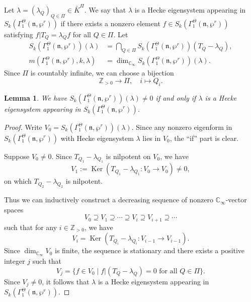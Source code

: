 \documentclass[11pt]{amsart}
\theoremstyle{plain}
\newtheorem{lem}[thm]{Lemma}
\theoremstyle{definition}
\DeclareMathOperator{\Ker}{Ker}
\newcommand{\bZ}{\mathbb{Z}}
\newcommand{\frn}{\mathfrak{n}}
\newcommand{\Cinf}{\mathbb{C}_{\infty}}
\begin{document}
Let $\lambda=(\lambda_Q)_{Q\in \Pi}\in \bar{K}^\Pi$. We say that $\lambda$ is a Hecke eigensystem appearing in $S_k(\Gamma_1^\Theta(\frn,\wp^r))$
if there exists a nonzero element $f\in S_k(\Gamma_1^\Theta(\frn,\wp^r))$ satisfying $f|T_Q=\lambda_Q f$ for all $Q\in \Pi$. Let
\[
\begin{aligned}
	S_k(\Gamma_1^\Theta(\frn,\wp^r))(\lambda)&=\bigcap_{Q\in\Pi}S_k(\Gamma_1^\Theta(\frn,\wp^r))(T_Q-\lambda_Q),\\
	m(\Gamma_1^\Theta(\frn,\wp^r),k,\lambda)&=\dim_{\Cinf}S_k(\Gamma_1^\Theta(\frn,\wp^r))(\lambda).
\end{aligned}
\]
Since $\Pi$ is countably infinite, we can choose a bijection
\[
\bZ_{>0}\to \Pi,\quad i\mapsto Q_i.
\]

\begin{lem}\label{LemGenESEigenform}
	We have $S_k(\Gamma_1^\Theta(\frn,\wp^r))(\lambda)\neq 0$ if and only if $\lambda$ is a Hecke eigensystem appearing in $S_k(\Gamma_1^\Theta(\frn,\wp^r))$.
\end{lem}
\begin{proof}
	Write $V_0=S_k(\Gamma_1^\Theta(\frn,\wp^r))(\lambda)$. Since any nonzero eigenform in $S_k(\Gamma_1^\Theta(\frn,\wp^r))$ with Hecke eigensystem $\lambda$
	lies in $V_0$, the ``if'' part is clear.
	
	Suppose $V_0\neq 0$. Since $T_{Q_1}-\lambda_{Q_1}$ is nilpotent on $V_0$, we have 
	\[
	V_1:=\Ker(T_{Q_1}-\lambda_{Q_1}: V_0\to V_0)\neq 0,
	\]
	on which $T_{Q_2}-\lambda_{Q_2}$ is nilpotent.
	
	Thus we can inductively construct a decreasing sequence of nonzero $\Cinf$-vector spaces
	\[
	V_0\supseteq V_1\supseteq \cdots \supseteq V_i\supseteq V_{i+1}\supseteq \cdots
	\]
	such that for any $i\in \bZ_{>0}$, we have 
	\[
	V_{i}=\Ker(T_{Q_{i}}-\lambda_{Q_{i}}:V_{i-1}\to V_{i-1}).
	\]
	Since $\dim_{\Cinf}V_0$ is finite, the sequence is stationary and there exists a positive integer $j$ such that
	\[
	V_j=\{f\in V_0\mid f|(T_Q-\lambda_Q)=0\text{ for all }Q\in\Pi\}.
	\]
	Since $V_j\neq 0$, it follows that $\lambda$ is a Hecke eigensystem appearing in $S_k(\Gamma_1^\Theta(\frn,\wp^r))$.
\end{proof}
\end{document}
